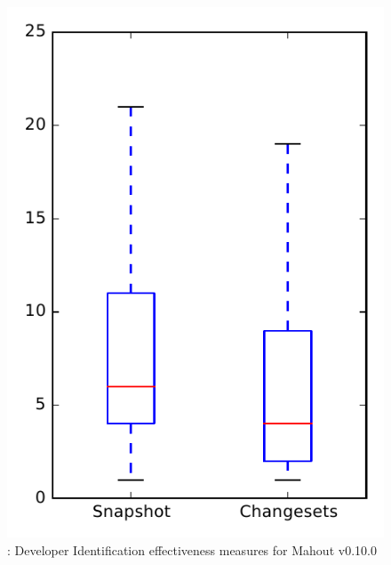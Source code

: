 
\begin{figure}
\centering
\includegraphics[height=0.4\textheight]{figures/dit/rq1_mahout_no_outlier}
\caption{\done: Developer Identification effectiveness measures for Mahout v0.10.0}
\label{fig:dit:rq1:mahout}
\end{figure}
